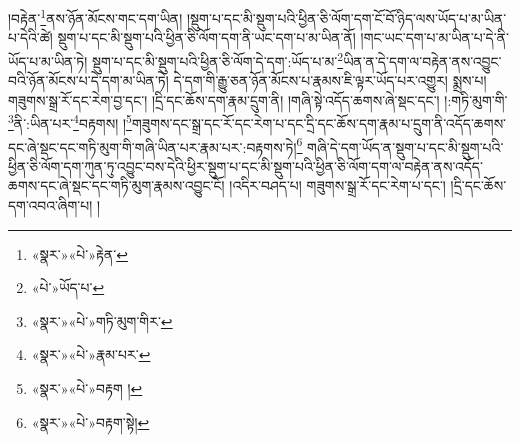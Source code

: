 །བརྟེན་\footnote{«སྣར་»«པེ་»རྟེན་}ནས་ཉོན་མོངས་གང་དག་ཡིན། །སྡུག་པ་དང་མི་སྡུག་པའི་ཕྱིན་ཅི་ལོག་དག་ངོ་བོ་ཉིད་ལས་ཡོད་པ་མ་ཡིན་པ་དེའི་ཚེ། སྡུག་པ་དང་མི་སྡུག་པའི་ཕྱིན་ཅི་ལོག་དག་ནི་ཡང་དག་པ་མ་ཡིན་ནོ། །གང་ཡང་དག་པ་མ་ཡིན་པ་དེ་ནི་ཡོད་པ་མ་ཡིན་ཏེ། སྡུག་པ་དང་མི་སྡུག་པའི་ཕྱིན་ཅི་ལོག་དེ་དག་:ཡོད་པ་མ་\footnote{«པེ་»ཡོད་པ་}ཡིན་ན་དེ་དག་ལ་བརྟེན་ནས་འབྱུང་བའི་ཉོན་མོངས་པ་དེ་དག་མ་ཡིན་ཏེ། དེ་དག་གི་རྒྱུ་ཅན་ཉོན་མོངས་པ་རྣམས་ཇི་ལྟར་ཡོད་པར་འགྱུར། སྨྲས་པ། གཟུགས་སྒྲ་རོ་དང་རེག་བྱ་དང་། །དྲི་དང་ཆོས་དག་རྣམ་དྲུག་ནི། །གཞི་སྟེ་འདོད་ཆགས་ཞེ་སྡང་དང་། །:གཏི་མུག་གི་\footnote{«སྣར་»«པེ་»གཏི་མུག་གིར་}ནི་:ཡིན་པར་\footnote{«སྣར་»«པེ་»རྣམ་པར་}བརྟགས། །\footnote{«སྣར་»«པེ་»བརྟག །}གཟུགས་དང་སྒྲ་དང་རོ་དང་རེག་པ་དང་དྲི་དང་ཆོས་དག་རྣམ་པ་དྲུག་ནི་འདོད་ཆགས་དང་ཞེ་སྡང་དང་གཏི་མུག་གི་གཞི་ཡིན་པར་རྣམ་པར་:བརྟགས་ཏེ།\footnote{«སྣར་»«པེ་»བརྟག་སྟེ།} གཞི་དེ་དག་ཡོད་ན་སྡུག་པ་དང་མི་སྡུག་པའི་ཕྱིན་ཅི་ལོག་དག་ཀུན་ཏུ་འབྱུང་བས་དེའི་ཕྱིར་སྡུག་པ་དང་མི་སྡུག་པའི་ཕྱིན་ཅི་ལོག་དག་ལ་བརྟེན་ནས་འདོད་ཆགས་དང་ཞེ་སྡང་དང་གཏི་མུག་རྣམས་འབྱུང་ངོ། །འདིར་བཤད་པ། གཟུགས་སྒྲ་རོ་དང་རེག་པ་དང་། །དྲི་དང་ཆོས་དག་འབའ་ཞིག་པ། །
